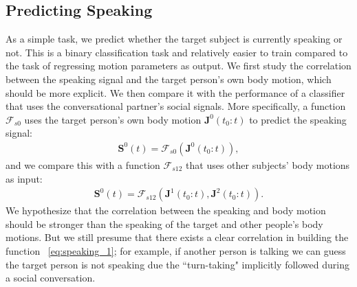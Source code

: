 \subsection{Predicting Speaking}
As a simple task, we predict whether the target subject is currently speaking or not. This is a binary classification task and relatively easier to train compared to the task of regressing motion parameters as output. We first study the correlation between the speaking signal and the target person's own body motion, which should be more explicit. We then compare it with the performance of a classifier that uses the conversational partner's social signals. More specifically, a function $\mathcal{F}_{s0}$ uses the target person's own body motion $\mathbf{J}^0(t_0:t)$ to predict the speaking signal:
\begin{gather}	
\mathbf{S}^0(t) = \mathcal{F}_{s0} ( \mathbf{J}^0(t_0:t)),
\label{eq:speaking_0}
\end{gather}
and we compare this with a function $\mathcal{F}_{s12}$ that uses other subjects' body motions as input:
\begin{gather}	
\mathbf{S}^0(t) = \mathcal{F}_{s12} ( \mathbf{J}^1(t_0:t), \mathbf{J}^2(t_0:t)).
\label{eq:speaking_1}
\end{gather}
We hypothesize that the correlation between the speaking and body motion should be stronger than the speaking of the target and other people's body motions. But we still presume that there exists a clear correlation in building the function ~\ref{eq:speaking_1}; for example, if another person is talking we can guess the target person is not speaking due the ``turn-taking" implicitly followed during a social conversation. %

